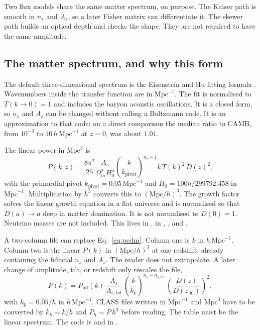 \documentclass[11pt]{article}
\begin{document}
Two flux models share the same matter spectrum, on purpose. The Kaiser path is smooth in $n_s$ and $A_s$, so a later Fisher matrix can differentiate it. The skewer path builds an optical depth and checks the shape. They are not required to have the same amplitude.

\subsection{The matter spectrum, and why this form}

The default three-dimensional spectrum is the Eisenstein and Hu fitting formula \cite{Eisenstein:1997ik}. Wavenumbers inside the transfer function are in $\mathrm{Mpc}^{-1}$. The fit is normalised to $T(k\to 0)=1$ and includes the baryon acoustic oscillations. It is a closed form, so $n_s$ and $A_s$ can be changed without calling a Boltzmann code. It is an approximation to that code: on a direct comparison the median ratio to CAMB, from $10^{-3}$ to $10\,h\,\mathrm{Mpc}^{-1}$ at $z=0$, was about $1.01$.

The linear power in $\mathrm{Mpc}^{3}$ is
\begin{equation}
\label{eq:pcdm}
P(k,z)
=
\frac{8\pi^{2}}{25}
\frac{A_s}{\Omega_m^{2} H_0^{4}}
\left(\frac{k}{k_\mathrm{pivot}}\right)^{n_s-1}
k\,T(k)^{2}\,D(z)^{2},
\end{equation}
with the primordial pivot $k_\mathrm{pivot}=0.05\,\mathrm{Mpc}^{-1}$ and
$H_0=100h/299792.458$ in $\mathrm{Mpc}^{-1}$.
Multiplication by $h^{3}$ converts this to $(\mathrm{Mpc}/h)^{3}$.
The growth factor solves the linear growth equation in a flat universe and is normalised so that $D(a)\to a$ deep in matter domination. It is not normalised to $D(0)=1$. Neutrino masses are not included. This lives in , in , , and .

A two-column file can replace Eq.~\eqref{eq:pcdm}. Column one is $k$ in $h\,\mathrm{Mpc}^{-1}$. Column two is the linear $P(k)$ in $(\mathrm{Mpc}/h)^{3}$ at one redshift, already containing the fiducial $n_s$ and $A_s$. The reader does not extrapolate. A later change of amplitude, tilt, or redshift only rescales the file,
\begin{equation}
\label{eq:table}
P(k)
=
P_\mathrm{fid}(k)\,
\frac{A_s}{A_{s,\mathrm{fid}}}\,
\left(\frac{k}{k_p}\right)^{n_s-n_{s,\mathrm{fid}}}\,
\left(\frac{D(z)}{D(z_\mathrm{fid})}\right)^{2},
\end{equation}
with $k_p=0.05/h$ in $h\,\mathrm{Mpc}^{-1}$. CLASS files written in $\mathrm{Mpc}^{-1}$ and $\mathrm{Mpc}^{3}$ have to be converted by $k_h=k/h$ and $P_h=P\,h^{3}$ before reading. The table must be the linear spectrum. The code is  and  in .
\end{document}

